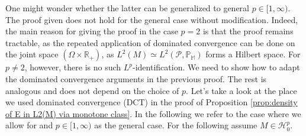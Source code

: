\documentclass[11pt,a4paper,twoside,openany]{report}
\numberwithin{equation}{section}
\theoremstyle{plain} %
\theoremstyle{definition} %
\theoremstyle{remark} %
\begin{document}
One might wonder whether the latter can be generalized to general \(p\in[1,\infty)\). The proof given does not hold for the general case without modification. Indeed, the main reason for giving the proof in the case \(p=2\) is that the proof remains tractable, as the repeated application of dominated convergence can be done on the joint space \((\Omega\times\mathbb{R}_+)\), as \(L^2(M)\simeq L^2(\mathcal{P},\mathbb{P_M})\) forms a Hilbert space. For \(p\neq 2\), however, there is no such \(L^p\)-identification. We need to show how to adapt the dominated convergence arguments in the previous proof. The rest is analogous and does not depend on the choice of \(p\). Let's take a look at the place we used dominated convergence (DCT) in the proof of Proposition \ref{prop:density of E in L2(M) via monotone class}. In the following we refer to the case where we allow for and \(p\in[1,\infty)\) as the general case. For the following assume \(M\in\mathcal{H}^p_0\).
\end{document}
